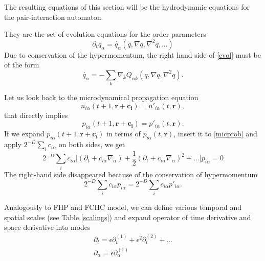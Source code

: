 \bigskip

The resulting equations of this section will be the hydrodynamic equations for the pair-interaction automaton.

They are the set of evolution equations for the order parameters
\begin{equation} \label{evol}
\partial_t q_{\alpha} = \dot{q_{\alpha}}(q,\nabla q, \nabla^2 q,...)
\end{equation}
Due to conservation of the hypermomentum, the right hand side of \ref{evol} must be of the form
\begin{equation}
\dot{q_{\alpha}} = -\sum_k \nabla_k Q_{\alpha k}(q, \nabla q, \nabla^2 q).
\end{equation}

Let us look back to the microdynamical propagation equation
\begin{equation}
n_{i\alpha}(t+1,\bm{r} + \bm{c_i}) = n'_{i\alpha}(t, \bm{r}),
\end{equation}
that directly implies
\begin{equation} \label{micprob}
p_{i\alpha}(t+1, \bm{r} + \bm{c_i}) = p'_{i\alpha}(t, \bm{r}).
\end{equation}
If we expand $p_{i\alpha}(t+1, \bm{r} + \bm{c_i})$ in terms of $p_{i\alpha}(t,\bm{r})$, insert it to \ref{micprob} and apply $2^{-D}\sum_i c_{i\alpha}$ on both sides, we get
\begin{equation} \label{dens}
2^{-D} \sum_i c_{i\alpha} \big[(\partial_t + c_{i\alpha}\nabla_{\alpha}) + \frac{1}{2}(\partial_t + c_{i\alpha}\nabla_{\alpha})^2 + ... \big] p_{i\alpha} = 0
\end{equation}
The right-hand side disappeared because of the conservation of hypermomentum
\begin{equation}
2^{-D} \sum_i c_{i\alpha} p_{i\alpha} = 2^{-D} \sum_i c_{i\alpha} p'_{i\alpha}.
\end{equation}


Analogously to FHP and FCHC model, we can define various temporal and spatial scales (see Table \ref{scalings}) and expand operator of time derivative and space derivative into modes
\begin{equation} \label{exoper}
\begin{split}
\partial_t = \epsilon \partial_t^{(1)} + \epsilon^2 \partial_t^{(2)} + ...\\
\partial_{\alpha} = \epsilon \partial_{\alpha}^{(1)}
\end{split}
\end{equation}

